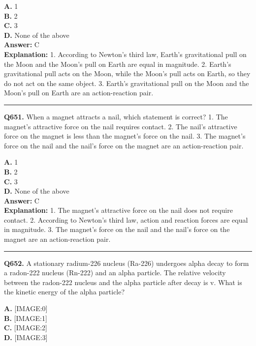 \documentclass[12pt]{article}
\begin{document}
\textbf{A.} 1 \\
\textbf{B.} 2 \\
\textbf{C.} 3 \\
\textbf{D.} None of the above \\

\textbf{Answer:} C \\
\textbf{Explanation:} 1.
According to Newton's third law, Earth's gravitational pull on the Moon and the Moon's pull on Earth are equal in magnitude.
2.
Earth's gravitational pull acts on the Moon, while the Moon's pull acts on Earth, so they do not act on the same object.
3.
Earth's gravitational pull on the Moon and the Moon's pull on Earth are an action-reaction pair.

\hrule
\vspace{1em}


\noindent
\textbf{Q651.} When a magnet attracts a nail, which statement is correct?
1.
The magnet's attractive force on the nail requires contact.
2.
The nail's attractive force on the magnet is less than the magnet's force on the nail.
3.
The magnet's force on the nail and the nail's force on the magnet are an action-reaction pair.



\textbf{A.} 1 \\
\textbf{B.} 2 \\
\textbf{C.} 3 \\
\textbf{D.} None of the above \\

\textbf{Answer:} C \\
\textbf{Explanation:} 1.
The magnet's attractive force on the nail does not require contact.
2.
According to Newton's third law, action and reaction forces are equal in magnitude.
3.
The magnet's force on the nail and the nail's force on the magnet are an action-reaction pair.

\hrule
\vspace{1em}


\noindent
\textbf{Q652.} A stationary radium-226 nucleus (Ra-226) undergoes alpha decay to form a radon-222 nucleus (Rn-222) and an alpha particle. The relative velocity between the radon-222 nucleus and the alpha particle after decay is v. What is the kinetic energy of the alpha particle?



\textbf{A.} [IMAGE:0] \\
\textbf{B.} [IMAGE:1] \\
\textbf{C.} [IMAGE:2] \\
\textbf{D.} [IMAGE:3] \\
\end{document}
